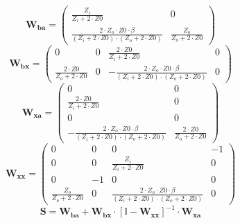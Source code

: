 \[ \mathbf{W_{ba}} = \left(\begin{smallmatrix} \frac{Z_i}{Z_i+2\cdot
Z0} & 0 \\ \frac{2\cdot Z_o\cdot Z0\cdot \beta}{\left(Z_i+2\cdot
Z0\right)\cdot\left(Z_o+2\cdot Z0\right)} & \frac{Z_o}{Z_o+2\cdot Z0}
\end{smallmatrix}\right) \]
\[ \mathbf{W_{bx}} = \left(\begin{smallmatrix} 0 & 0 & \frac{2\cdot
Z0}{Z_i+2\cdot Z0} & 0 \\ \frac{2\cdot Z0}{Z_o+2\cdot Z0} & 0 &
-\frac{2\cdot Z_o\cdot Z0\cdot \beta}{\left(Z_i+2\cdot
Z0\right)\cdot\left(Z_o+2\cdot Z0\right)} & 0 \end{smallmatrix}\right)
\]
\[ \mathbf{W_{xa}} = \left(\begin{smallmatrix} 0 & 0 \\ \frac{2\cdot
Z0}{Z_i+2\cdot Z0} & 0 \\ 0 & 0 \\ -\frac{2\cdot Z_o\cdot Z0\cdot
\beta}{\left(Z_i+2\cdot Z0\right)\cdot\left(Z_o+2\cdot Z0\right)} &
\frac{2\cdot Z0}{Z_o+2\cdot Z0} \end{smallmatrix}\right) \]
\[ \mathbf{W_{xx}} = \left(\begin{smallmatrix} 0 & 0 & 0 & -1 \\ 0 & 0
& \frac{Z_i}{Z_i+2\cdot Z0} & 0 \\ 0 & -1 & 0 & 0 \\
\frac{Z_o}{Z_o+2\cdot Z0} & 0 & \frac{2\cdot Z_o\cdot Z0\cdot
\beta}{\left(Z_i+2\cdot Z0\right)\cdot\left(Z_o+2\cdot Z0\right)} & 0
\end{smallmatrix}\right) \]
\[ \mathbf{S}=\mathbf{W_{ba}}+\mathbf{W_{bx}}\cdot\left[ \mathbb{I}
-\mathbf{W_{xx}}\right]^{-1}\cdot\mathbf{W_{xa}} \]
